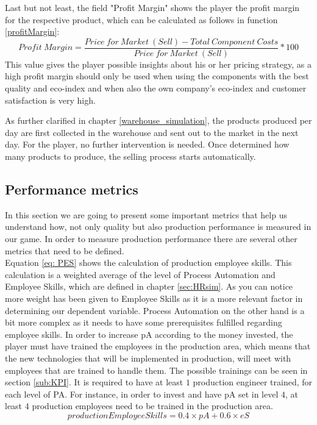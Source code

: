 Last but not least, the field "Profit Margin" shows the player the profit margin for the respective product, which can be calculated as follows in function \ref{profitMargin}:
\begin{equation}
\label{profitMargin}
    Profit~Margin = \frac{Price~for~Market~(Sell) - Total~Component ~Costs}{Price~for~Market~(Sell)} * 100
\end{equation}
This value gives the player possible insights about his or her pricing strategy, as a high profit margin should only be used when using the components with the best quality and eco-index and when also the own company's eco-index and customer satisfaction is very high.

As further clarified in chapter \ref{warehouse_simulation}, the products produced per day are first collected in the warehouse and sent out to the market in the next day. For the player, no further intervention is needed. Once determined how many products to produce, the selling process starts automatically.

\subsection{Performance metrics}
\label{sub:PM}
In this section we are going to present some important metrics that help us understand how, not only quality but also production performance is measured in our game. In order to measure production performance there are several other metrics that need to be defined. \\
Equation \ref{eq: PES} shows the calculation of production employee skills. This calculation is a weighted average of the level of Process Automation and Employee Skills, which are defined in chapter \ref{sec:HRsim}. As you can notice more weight has been given to Employee Skills as it is a more relevant factor in determining our dependent variable. Process Automation on the other hand is a bit more complex as it needs to have some prerequisites fulfilled regarding employee skills. In order to increase pA according to the money invested, the player must have trained the employees in the production area, which means that the new technologies that will be implemented in production, will meet with employees that are trained to handle them. The possible trainings can be seen in section \ref{sub:KPI}. It is required to have at least $1$ production engineer trained, for each level of PA. For instance, in order to invest and have pA set in level $4$, at least $4$ production employees need to be trained in the production area.
\begin{equation}
production Employee Skills= 0.4\times pA + 0.6\times eS
\label{eq: PES}
\end{equation}

